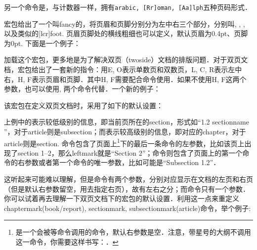 另一个命令是，与计数器一样，拥有\texttt{arabic, [Rr]oman, [Aa]lph}五种页码形式．

宏包给出了一个叫fancy的，将页眉和页脚分别分为左中右三个部分，分别叫, , , 以及类似的[lcr]foot. 页眉页脚处的横线粗细也可以定义，默认页眉为0.4pt、页脚为0pt. 下面是一个例子：
\begin{latex}
\usepackage{fancyhdr}
\pagestyle{fancy}
    \lhead{}
    \chead{}
    \cfoot{\thepage}
\renewcommand{\headrulewidth}{0.4pt}
\renewcommand{\footrulewidth}{0.4pt}
\end{latex}

加载这个宏包，更多地是为了解决双页（twoside）文档的排版问题．对于双页文档，宏包给出了一套新的指令：用E, O表示单数页和双数页，L, C, R表示左中右，H, F表示页眉和页脚．其中H, F需要配合命令使用．如果不使用H, F这两个参数，也可以使用,  两个命令代替．一个新的例子：
\begin{latex}
\fancyhead{} %
\fancyfoot{} %
    \fancyfoot[C]{\thepage}
\end{latex}

该宏包在定义双页文档时，采用了如下的默认设置：
\begin{latex}
\fancyhead[LE,RO]{\slshape \rightmark}
\fancyhead[LO,RE]{\slshape \leftmark}
\fancyfoot[C]{\thepage}
\end{latex}

上例中的表示较低级别的信息，即当前页所在的section，形式如“1.2 sectionname ”，对于article则是subsection；而表示较高级别的信息，即对应的chapter，对于article则是section. 命令包含了页面上\footnote{是一个会被等命令调用的命令，默认右参数是空．注意，带星号的大纲不调用这一命令，你需要这样书写：．}下的最后一条命令的左参数，比如该页上出现了section 1--2，那么leftmark就是“Section 2”；命令则包含了页面上的第一个命令的右参数或者第一个命令的唯一参数，比如可能是“Subsection 1.2”．

这听起来可能难以理解，但是命令有两个参数，分别对应显示在文档的左页和右页（但是默认右参数留空，用去指定右页），故有左右之分；而命令只有一个参数．你可以试着再去理解一下双页文档下的宏包的默认设置．利用这一点来重定义chaptermark(book/report), sectionmark, subsectionmark(article)命令，举个例子:
\begin{latex}
\renewcommand{\sectionmark}[1]{\markright{\thesection.\ #1}}
\renewcommand{\chaptermark}[1]{\markboth{\MakeUppercase{%
    \chaptername}\ \thechapter.\ #1}{}}
\end{latex}

